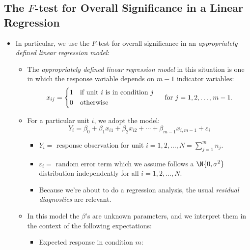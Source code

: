 \subsection{The \texorpdfstring{$ F $}{F}-test for Overall Significance in a Linear Regression}
\begin{itemize}
      \item In particular, we use the $ F $-test for overall significance in an
            \emph{appropriately defined linear regression model}:
            \begin{itemize}
                  \item The \emph{appropriately defined linear regression model}
                        in this situation is one in which the response
                        variable depends on $ m-1 $ indicator variables:
                        \[ x_{ij}=\begin{cases*}
                                    1 & if unit $ i $ is in condition $ j $ \\
                                    0 & otherwise
                              \end{cases*}\quad\text{for }j=1,2,\ldots,m-1. \]
                  \item For a particular unit $ i $, we adopt the model:
                        \[ Y_{i}=\beta_0+\beta_1x_{i1}+\beta_2x_{i2}+\cdots+\beta_{m-1}x_{i,m-1}+\varepsilon_i \]
                        \begin{itemize}
                              \item $ Y_i = $ response observation for unit $ i=1,2,\ldots,N=\sum_{j=1}^{m} n_j $.
                              \item $ \varepsilon_i = $ random error term which we assume follows a $ \N{0,\sigma^2} $ distribution
                                    independently for all $ i=1,2,\ldots,N $.
                              \item Because we're about to do a regression analysis, the usual \emph{residual diagnostics} are relevant.
                        \end{itemize}
                  \item In this model the $ \beta $'s are unknown parameters,
                        and we interpret them in the context of the
                        following expectations:
                        \begin{itemize}
                              \item Expected response in condition $ m $:

\end{itemize}
\end{itemize}
\end{itemize}
